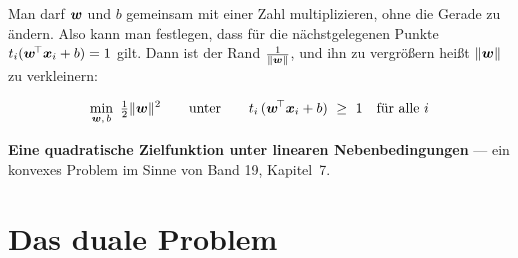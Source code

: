 \begin{merksatz}
Man darf $\boldsymbol{w}$ und $b$ gemeinsam mit einer Zahl multiplizieren, ohne die Gerade zu ändern. Also kann man festlegen, dass für die nächstgelegenen Punkte $t_i(\boldsymbol{w}^{\!\top}\boldsymbol{x}_i+b) = 1$ gilt. Dann ist der Rand $\frac{1}{\|\boldsymbol{w}\|}$, und ihn zu vergrößern heißt $\|\boldsymbol{w}\|$ zu verkleinern:

\[ \min_{\vek w,\,b}\ \tfrac12\|\vek w\|^{2} \qquad\text{unter}\qquad t_i\,(\vek w^{\!\top}\vek x_i + b) \ \ge\ 1 \quad\text{für alle } i \]

\begin{center}
\begin{minipage}{0.9\textwidth}
\textbf{Eine quadratische Zielfunktion unter linearen Nebenbedingungen} --- ein konvexes Problem im Sinne von Band 19, Kapitel~7.
\end{minipage}
\end{center}
\end{merksatz}

\section{Das duale Problem}

